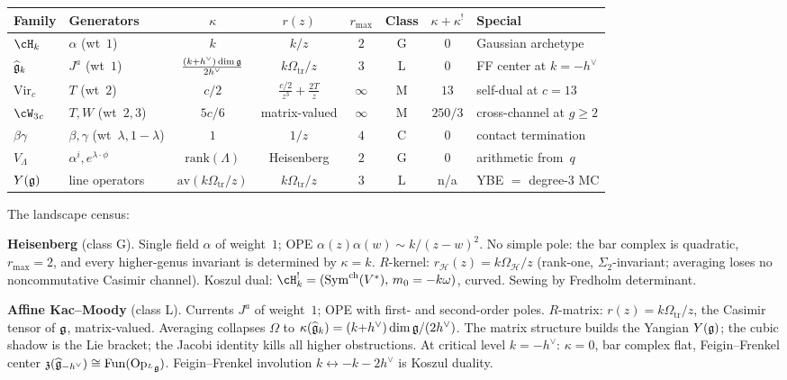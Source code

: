 \begin{center}
\renewcommand{\arraystretch}{1.2}
\small
\begin{tabular}{llcccccl}
\textbf{Family}
 & \textbf{Generators}
 & $\kappa$
 & $r(z)$
 & $r_{\max}$
 & \textbf{Class}
 & $\kappa+\kappa^!$
 & \textbf{Special}\\
\hline
$\cH_k$
 & $\alpha$ (wt~$1$)
 & $k$
 & $k/z$
 & $2$
 & G
 & $0$
 & Gaussian archetype\\[2pt]
$\widehat{\mathfrak{g}}_k$
 & $J^a$ (wt~$1$)
 & $\frac{(k{+}h^\vee)\dim\mathfrak{g}}{2h^\vee}$
 & $k\Omega_{\mathrm{tr}}/z$
 & $3$
 & L
 & $0$
 & FF center at $k{=}{-}h^\vee$\\[4pt]
$\mathrm{Vir}_c$
 & $T$ (wt~$2$)
 & $c/2$
 & $\frac{c/2}{z^3}+\frac{2T}{z}$
 & $\infty$
 & M
 & $13$
 & self-dual at $c{=}13$\\[4pt]
$\cW_3{}_c$
 & $T,W$ (wt~$2,3$)
 & $5c/6$
 & matrix-valued
 & $\infty$
 & M
 & $250/3$
 & cross-channel at $g{\ge}2$\\[4pt]
$\beta\gamma$
 & $\beta,\gamma$ (wt~$\lambda,1{-}\lambda$)
 & $1$
 & $1/z$
 & $4$
 & C
 & $0$
 & contact termination\\[2pt]
$V_\Lambda$
 & $\alpha^i,e^{\lambda\cdot\phi}$
 & $\mathrm{rank}(\Lambda)$
 & Heisenberg
 & $2$
 & G
 & $0$
 & arithmetic from~$q$\\[2pt]
$Y(\mathfrak{g})$
 & line operators
 & $\mathrm{av}(k\Omega_{\mathrm{tr}}/z)$
 & $k\Omega_{\mathrm{tr}}/z$
 & $3$
 & L
 & n/a
 & YBE $=$ degree-$3$ MC
\end{tabular}
\end{center}

\medskip
\noindent
The landscape census:

\medskip
\noindent\textbf{Heisenberg} (class G).
Single field $\alpha$ of weight~$1$;
OPE $\alpha(z)\alpha(w)\sim k/(z{-}w)^2$. No simple pole:
the bar complex is quadratic, $r_{\max}=2$, and every
higher-genus invariant is determined by $\kappa=k$.
$R$-kernel: $r_{\mathcal H}(z)=k\Omega_{\mathcal H}/z$ (rank-one,
$\Sigma_2$-invariant; averaging loses no noncommutative Casimir
channel). Koszul dual:
$\cH_k^!=(\mathrm{Sym}^{\mathrm{ch}}(V^*),\,m_0=-k\omega)$,
curved. Sewing by Fredholm determinant.

\medskip
\noindent\textbf{Affine Kac--Moody} (class L).
Currents $J^a$ of weight~$1$; OPE with first- and second-order
poles. $R$-matrix: $r(z)=k\Omega_{\mathrm{tr}}/z$, the Casimir tensor of
$\mathfrak{g}$, matrix-valued. Averaging collapses $\Omega$ to
$\kappa(\widehat{\mathfrak{g}}_k)=(k{+}h^\vee)\dim\mathfrak{g}/(2h^\vee)$. The
matrix structure builds the Yangian $Y(\mathfrak{g})$; the cubic shadow
is the Lie bracket; the Jacobi identity kills all higher
obstructions.
At critical level $k=-h^\vee$: $\kappa=0$, bar complex flat,
Feigin--Frenkel center
$\mathfrak z(\widehat{\mathfrak{g}}_{-h^\vee})\cong
\mathrm{Fun}(\mathrm{Op}_{{}^L\mathfrak{g}})$.
Feigin--Frenkel involution $k\leftrightarrow -k-2h^\vee$
is Koszul duality.

